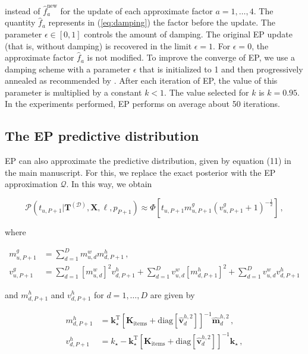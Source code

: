 instead of $\hat{f}_a^\text{new}$ for the update of each approximate factor $a = 1,\ldots,4$.
The quantity $\hat{f}_a$ represents in (\ref{eq:damping})
the factor before the update. The parameter
$\epsilon \in [0,1]$ controls the amount of damping.
The original EP update (that is, without damping)
is recovered in the limit $\epsilon = 1$. For $\epsilon = 0$,
the approximate factor $\hat{f}_a$ is not modified.
To improve the converge of EP, we use a damping scheme
with a parameter $\epsilon$ that is initialized to 1
and then progressively annealed as recommended by \cite{HernandezLobato2010}.
After each iteration of EP, the value of
this parameter is multiplied by a constant $k < 1$.
The value selected for $k$ is $k = 0.95$.
In the experiments performed, EP performs on average about 50 iterations.

\subsection{The EP predictive distribution}

EP can also approximate the predictive distribution, given by equation (11) in the main manuscript. 
For this, we replace the exact posterior with the EP approximation $\mathcal{Q}$. In this way, we obtain

\begin{equation}
\mathcal{P}(t_{u,P+1}|\mathbf{T}^{(\mathcal{D})},\mathbf{X},\ell,p_{P+1}) \approx 
\Phi\left[t_{u,P+1} m_{u,P+1}^g(v_{u,P+1}^g + 1)^{-\frac{1}{2}}\right]\,,
\end{equation}

where

\begin{align}
m_{u,P+1}^g & = \sum_{d=1}^D  m_{u,d}^w m_{d,P+1}^h\,,\\
v_{u,P+1}^g & = \sum_{d=1}^D  [m_{u,d}^w]^2 v_{d,P+1}^h + \sum_{d=1}^D v_{u,d}^w [m_{d,P+1}^h]^2 + \sum_{d=1}^D v_{u,d}^w v_{d,P+1}^h
\end{align}

and $m_{d,P+1}^h$ and $v_{d,P+1}^h$ for $d = 1,\ldots,D$ are given by

\begin{align}
m_{d,P+1}^h & = \mathbf{k}_\star^\text{T} \left[ \mathbf{K}_\text{items} +
\text{diag}[\hat{\mathbf{v}}_d^{h,2}] \right]^{-1} \hat{\mathbf{m}}_d^{h,2}\,,\label{eq:predictiveMean}\\
v_{d,P+1}^h & = k_\star - \mathbf{k}_\star^\text{T} \left[ \mathbf{K}_\text{items} +
\text{diag}[\hat{\mathbf{v}}_d^{h,2}] \right]^{-1} \mathbf{k}_\star\,,\label{eq:predictiveVariance}
\end{align}


